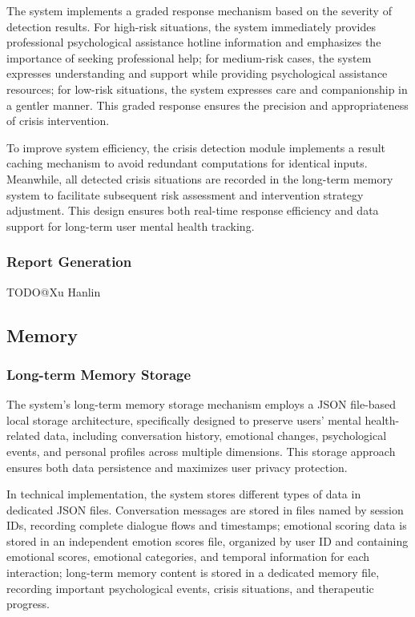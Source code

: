 The system implements a graded response mechanism based on the severity of detection results. For high-risk situations, the system immediately provides professional psychological assistance hotline information and emphasizes the importance of seeking professional help; for medium-risk cases, the system expresses understanding and support while providing psychological assistance resources; for low-risk situations, the system expresses care and companionship in a gentler manner. This graded response ensures the precision and appropriateness of crisis intervention.

To improve system efficiency, the crisis detection module implements a result caching mechanism to avoid redundant computations for identical inputs. Meanwhile, all detected crisis situations are recorded in the long-term memory system to facilitate subsequent risk assessment and intervention strategy adjustment. This design ensures both real-time response efficiency and data support for long-term user mental health tracking.

\subsubsection{Report Generation}

TODO@Xu Hanlin

\subsection{Memory}

\subsubsection{Long-term Memory Storage}

The system's long-term memory storage mechanism employs a JSON file-based local storage architecture, specifically designed to preserve users' mental health-related data, including conversation history, emotional changes, psychological events, and personal profiles across multiple dimensions. This storage approach ensures both data persistence and maximizes user privacy protection.

In technical implementation, the system stores different types of data in dedicated JSON files. Conversation messages are stored in files named by session IDs, recording complete dialogue flows and timestamps; emotional scoring data is stored in an independent emotion scores file, organized by user ID and containing emotional scores, emotional categories, and temporal information for each interaction; long-term memory content is stored in a dedicated memory file, recording important psychological events, crisis situations, and therapeutic progress.

